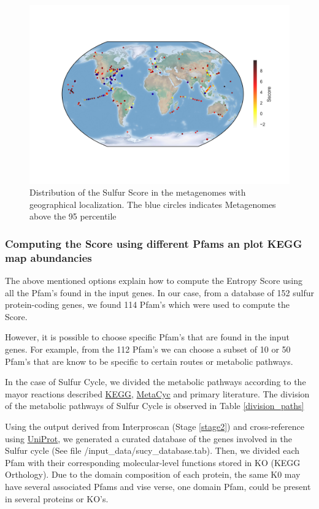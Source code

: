 \documentclass[12pt]{report}
\begin{document}
\begin{figure}[H]
  \centering
    \includegraphics[width=160mm, scale =1]{world_map_SS.png}
    \caption{Distribution of the Sulfur Score in the metagenomes with geographical localization. The blue circles indicates Metagenomes above the 95 percentile}
        \label{fig:differential}
\end{figure}

\subsubsection{Computing the Score using different Pfams an plot KEGG map
abundancies}

The above mentioned options explain how to compute the Entropy Score using all
the Pfam's found in the input genes. In our case, from a database of 152 sulfur
protein-coding genes, we found 114 Pfam's which were used to compute the Score.

However, it is possible to choose specific Pfam's that are found in the input
genes. For example, from the 112 Pfam's we can choose a subset of 10 or 50
Pfam's that are know to be specific to certain routes or metabolic pathways.

In the case of Sulfur Cycle, we divided the metabolic pathways according to the
mayor reactions described \href{http://www.genome.jp/kegg/}{KEGG},
\href{https://metacyc.org/}{MetaCyc} and primary literature. The division of
the metabolic pathways of Sulfur Cycle is observed in Table
\ref{division_paths} 

Using the output derived from Interproscan (Stage \ref{stage2}) and
cross-reference using  \href{http://www.uniprot.org/}{UniProt}, we generated a
curated database of the genes involved in the Sulfur cycle (See file
/input\_data/sucy\_database.tab). Then, we divided each Pfam with their
corresponding molecular-level functions stored in  KO (KEGG Orthology). Due to
the domain composition of each protein, the same K0 may have several associated
Pfams and vise verse, one domain Pfam, could be present in several proteins or
KO's.  
\end{document}
